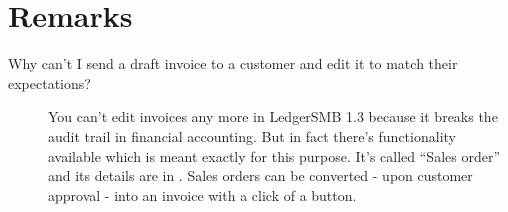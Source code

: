 %
%
%
%
%
%
%
%
%
%
%
%
%


\section{Remarks}

\begin{description}
\item [Why can't I send a draft invoice to a customer and edit it
   to match their expectations?] 
You can't edit invoices any more in LedgerSMB 1.3 because it breaks the audit trail
in financial accounting. But in fact there's functionality available which is meant
exactly for this purpose. It's called ``Sales order'' and its details are in
. Sales orders can be converted - upon customer approval -
into an invoice with a click of a button.
\end{description}


